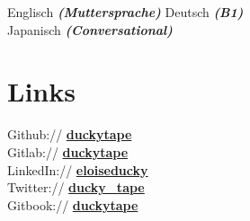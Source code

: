 \documentclass[a4paper]{deedy-resume_twopage} %
\begin{document}
\begin{minipage}[t]{0.33\textwidth}
  \sectionspace

  \textbullet{} Englisch {\footnotesize \textit{\textbf{(Muttersprache)}}} \textbullet{} Deutsch {\footnotesize \textit{\textbf{(B1)}}} \\
  \textbullet{} Japanisch {\footnotesize \textit{\textbf{(Conversational)}}} \\

  \sectionspace %

  \sectionspace
  \section{Links}

  Github:// \href{https://github.com/duckytape}{\bf duckytape} \\
  Gitlab:// \href{https://gitlab.com/duckytape} {\bf duckytape} \\
  LinkedIn:// \href{https://www.linkedin.com/in/eloiseducky}{\bf eloiseducky} \\
  Twitter:// \href{https://twitter.com/ducky_tape}{\bf ducky\_tape}\\
  Gitbook:// \href{https:duckytape.gitbooks.io//}{\bf duckytape} \\

  \sectionspace %



\end{minipage} %


\newpage %
\end{document}
